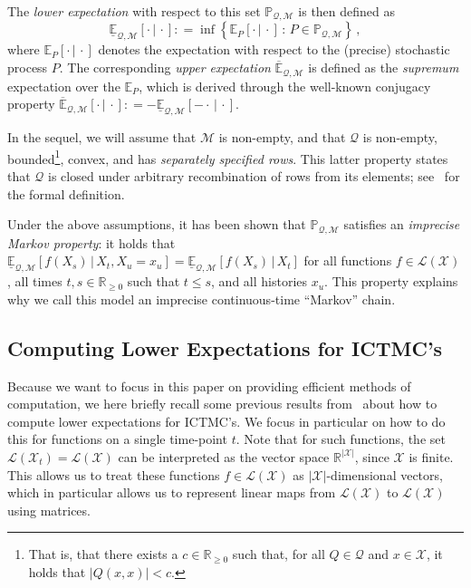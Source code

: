 \documentclass[twoside,11pt]{article}
\newcommand{\reals}{\mathbb{R}}
\newcommand{\realsnonneg}{\reals_{\geq 0}}
\newcommand{\states}{\mathcal{X}}
\newcommand{\lexp}{\underline{\mathbb{E}}_{\rateset,\mathcal{M}}}
\newcommand{\uexp}{\overline{\mathbb{E}}_{\rateset,\mathcal{M}}}
\newcommand{\gambles}{\mathcal{L}}
\newcommand{\gamblesX}{\gambles(\states)}
\newcommand{\rateset}{\mathcal{Q}}
\newcommand{\abs}[1]{\left\vert #1 \right\vert}
\newcommand{\coloneqq}{:\!=}
\begin{document}
The \emph{lower expectation} with respect to this set $\mathbb{P}_{\rateset,\mathcal{M}}$ is then defined as
\begin{equation*}
\underline{\mathbb{E}}_{\rateset,\mathcal{M}}[\cdot\,\vert\,\cdot] \coloneqq \inf\left\{ \mathbb{E}_P[\cdot\,\vert\,\cdot]\,:\, P\in\mathbb{P}_{\rateset,\mathcal{M}} \right\}\,,
\end{equation*}
where $\mathbb{E}_P[\cdot\,\vert\,\cdot]$ denotes the expectation with respect to the (precise) stochastic process $P$. The corresponding \emph{upper expectation} $\uexp$ is defined as the \emph{supremum} expectation over the $\mathbb{E}_P$, which is derived through the well-known conjugacy property $\uexp[\cdot\,\vert\,\cdot]\coloneqq -\lexp[-\cdot\,\vert\,\cdot]$.

In the sequel, we will assume that $\mathcal{M}$ is non-empty, and that $\rateset$ is non-empty, bounded\footnote{That is, that there exists a $c\in\realsnonneg$ such that, for all $Q\in\rateset$ and $x\in\states$, it holds that $\abs{Q(x,x)}<c$.}, convex, and has \emph{separately specified rows}. This latter property states that $\rateset$ is closed under arbitrary recombination of rows from its elements; see~\citep[Definition 24]{krak2016ictmc} for the formal definition. %

Under the above assumptions, it has been shown that $\mathbb{P}_{\rateset,\mathcal{M}}$ satisfies an \emph{imprecise Markov property}: it holds that $\lexp[f(X_s)\,\vert\,X_t,X_u=x_u]=\lexp[f(X_s)\,\vert\,X_t]$ for all functions $f\in\gamblesX$, all times $t,s\in\realsnonneg$ such that $t\leq s$, and all histories $x_u$. This property explains why we call this model an imprecise continuous-time ``Markov'' chain.

\subsection{Computing Lower Expectations for ICTMC's}\label{subsec:ICTMC_computations}

Because we want to focus in this paper on providing efficient methods of computation, we here briefly recall some previous results from~\citet{krak2016ictmc} about how to compute lower expectations for ICTMC's. We focus in particular on how to do this for functions on a single time-point $t$. Note that for such functions, the set $\gambles(\states_t)=\gamblesX$ can be interpreted as the vector space $\reals^{\lvert\states\rvert}$, since $\states$ is finite. This allows us to treat these functions $f\in\gamblesX$ as $\lvert\states\rvert$-dimensional vectors, which in particular allows us to represent linear maps from $\gamblesX$ to $\gamblesX$ using matrices.
\end{document}
